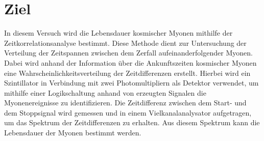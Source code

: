 \section{Ziel}
\label{sec:Ziel}

In diesem Versuch wird die Lebensdauer kosmischer Myonen mithilfe der Zeitkorrelationsanalyse bestimmt.
Diese Methode dient zur Untersuchung der Verteilung der Zeitspannen zwischen dem
Zerfall aufeinanderfolgender Myonen.
Dabei wird anhand der Information über die Ankunftszeiten kosmischer Myonen
eine Wahrscheinlichkeitsverteilung der Zeitdifferenzen erstellt.
Hierbei wird ein Szintillator in Verbindung mit zwei Photomultipliern als Detektor verwendet,
um mithilfe einer Logikschaltung anhand von erzeugten Signalen die Myonenereignisse zu identifizieren.
Die Zeitdifferenz zwischen dem Start- und dem Stoppsignal wird gemessen und in einem Vielkanalanalysator aufgetragen, 
um das Spektrum der Zeitdifferenzen zu erhalten. 
Aus diesem Spektrum kann die Lebensdauer der Myonen bestimmt werden.